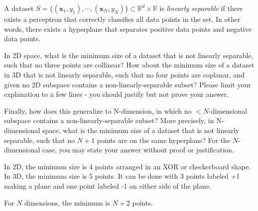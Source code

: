 \begin{problem}[4]
  A dataset $S = \{(\mathbf{x}_1, y_1),\cdots,(\mathbf{x}_N, y_N)\} \subset \mathbb{R}^d \times \mathbb{R}$ is \emph{linearly separable} if there exists a perceptron that correctly classifies all data points in the set. In other words, there exists a hyperplane that separates positive data points and negative data points.

  In 2D space, what is the minimum size of a dataset that is not linearly separable, such that no three points are collinear? How about the minimum size of a dataset in 3D that is not linearly separable, such that no four points are coplanar, and given no 2D subspace contains a non-linearly-separable subset? Please limit your explanation to a few lines - you should justify but not prove your answer.

  Finally, how does this generalize to N-dimension, in which no $<N$-dimensional subspace contains a non-linearly-separable subset? More precisely, in N-dimensional space, what is the minimum size of a dataset that is not linearly separable, such that no $N+1$ points are on the same hyperplane? For the $N$-dimensional case, you may state your answer without proof or justification.

\end{problem}
\begin{solution}
  In 2D, the minimum size is 4 points arranged in an XOR or checkerboard shape.
  In 3D, the minimum size is 5 points. It can be done with 3 points labeled +1 making a plane and one point labeled -1 on either side of the plane.

  For $N$ dimensions, the minimum is $N + 2$ points.
\end{solution}

